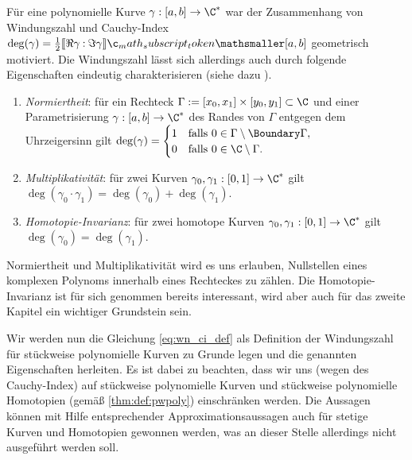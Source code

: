 \documentclass{mythesis}
\begin{document}
Für eine polynomielle Kurve $\gamma: [a,b] \to \C^*$ war der Zusammenhang von Windungszahl und Cauchy-Index
\begin{math}[numbered] \label{eq:wn_ci_def}
    \deg(\gamma) = \frac{1}{2} \Index{[a,b]}{\Re \gamma}{\Im \gamma}
\end{math}
geometrisch motiviert.
Die Windungszahl lässt sich allerdings auch durch folgende Eigenschaften eindeutig charakterisieren (siehe dazu \cite[Theorem 5.13, (3)]{eisermann2012fundamental}).
\begin{enumerate}[(W1),leftmargin=3.5em]
    \item
        \emph{Normiertheit}: für ein Rechteck $\Gamma := [x_0, x_1] \times [y_0, y_1] \subset \C$ und einer Parametrisierung $\gamma: [a,b] \to \C^*$ des Randes von $\Gamma$ entgegen dem Uhrzeigersinn gilt
        \begin{math}
            \deg(\gamma) = \begin{cases}
                1 & \text{falls $0 \in \Gamma \setminus \Boundary\Gamma$}, \\
                0 & \text{falls $0 \in \C \setminus \Gamma$}.
            \end{cases}
        \end{math}
    \item
        \emph{Multiplikativität}: für zwei Kurven $\gamma_0, \gamma_1: [0,1] \to \C^*$ gilt
        \begin{math}
            \deg(\gamma_0 \cdot \gamma_1) = \deg(\gamma_0) + \deg(\gamma_1).
        \end{math}
    \item
        \emph{Homotopie-Invarianz}: für zwei homotope Kurven $\gamma_0, \gamma_1: [0,1] \to \C^*$ gilt
        \begin{math}
            \deg(\gamma_0) = \deg(\gamma_1).
        \end{math}
\end{enumerate}
Normiertheit und Multiplikativität wird es uns erlauben, Nullstellen eines komplexen Polynoms innerhalb eines Rechteckes zu zählen.
Die Homotopie-Invarianz ist für sich genommen bereits interessant, wird aber auch für das zweite Kapitel ein wichtiger Grundstein sein.

Wir werden nun die Gleichung \eqref{eq:wn_ci_def} als Definition der Windungszahl für stückweise polynomielle Kurven zu Grunde legen und die genannten Eigenschaften herleiten.
Es ist dabei zu beachten, dass wir uns (wegen des Cauchy-Index) auf stückweise polynomielle Kurven und stückweise polynomielle Homotopien (gemäß \ref{thm:def:pwpoly}) einschränken werden.
Die Aussagen können mit Hilfe entsprechender Approximationsaussagen auch für stetige Kurven und Homotopien gewonnen werden, was an dieser Stelle allerdings nicht ausgeführt werden soll.
\end{document}
